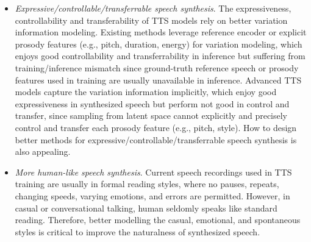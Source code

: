 \documentclass{article}
\begin{document}
\begin{itemize}[leftmargin=*]
    \item \textit{Expressive/controllable/transferrable speech synthesis}. The expressiveness, controllability and transferability of TTS models rely on better variation information modeling. Existing methods leverage reference encoder or explicit prosody features (e.g., pitch, duration, energy) for variation modeling, which enjoys good controllability and transferrability in inference but suffering from training/inference mismatch since ground-truth reference speech or prosody features used in training are usually unavailable in inference. Advanced TTS models capture the variation information implicitly, which enjoy good expressiveness in synthesized speech but perform not good in control and transfer, since sampling from latent space cannot explicitly and precisely control and transfer each prosody feature (e.g., pitch, style). How to design better methods for expressive/controllable/transferrable speech synthesis is also appealing.
    
    \item \textit{More human-like speech synthesis}. Current speech recordings used in TTS training are usually in formal reading styles, where no pauses, repeats, changing speeds, varying emotions, and errors are permitted. However, in casual or conversational talking, human seldomly speaks like standard reading. Therefore, better modelling the casual, emotional, and spontaneous styles is critical to improve the naturalness of synthesized speech. 
    
  \end{itemize}
    
\end{document}
